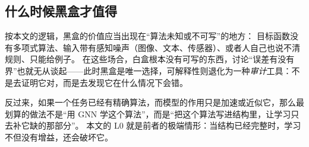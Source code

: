\subsection{什么时候黑盒才值得}

按本文的逻辑，黑盒的价值应当出现在“算法未知或不可写”的地方：
目标函数没有多项式算法、输入带有感知噪声（图像、文本、传感器）、或者人自己也说不清规则、只能给例子。
在这些场合，白盒根本没有可写的东西，讨论“误差有没有界”也就无从谈起——此时黑盒是唯一选择，可解释性则退化为一种\emph{审计}工具：不是去证明它对，而是去发现它在什么情况下会错。

反过来，如果一个任务已经有精确算法，而模型的作用只是加速或近似它，那么最划算的做法不是“用 GNN 学这个算法”，而是“把这个算法写进结构里，让学习只去补它缺的那部分”。
本文的 L0 就是前者的极端情形：当结构已经完整时，学习不但没有增益，还会破坏它。
